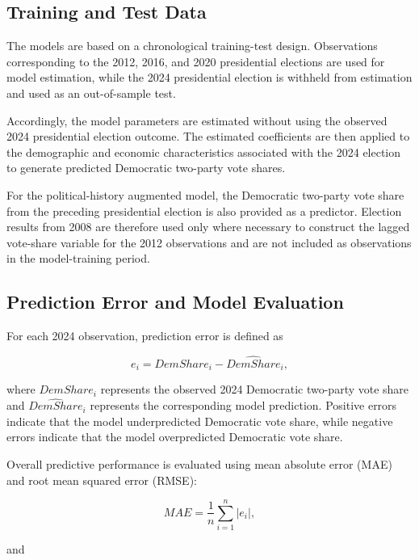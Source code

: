 \documentclass[12pt]{article}
\begin{document}
	
	\subsection{Training and Test Data}
	
	The models are based on a chronological training-test design.
	Observations corresponding to the 2012, 2016, and 2020 presidential
	elections are used for model estimation, while the 2024 presidential
	election is withheld from estimation and used as an out-of-sample test.
	
	Accordingly, the model parameters are estimated without using the
	observed 2024 presidential election outcome. The estimated coefficients
	are then applied to the demographic and economic characteristics
	associated with the 2024 election to generate predicted Democratic
	two-party vote shares.
	
	For the political-history augmented model, the Democratic
	two-party vote share from the preceding presidential election is also
	provided as a predictor. Election results from 2008 are therefore used
	only where necessary to construct the lagged vote-share variable for
	the 2012 observations and are not included as observations
	in the model-training period.
	
	
	\subsection{Prediction Error and Model Evaluation}
	
	For each 2024 observation, prediction error is defined as
	
	\begin{equation}
		e_i
		=
		DemShare_i - \widehat{DemShare}_i,
	\end{equation}
	
	where $DemShare_i$ represents the observed 2024 Democratic two-party
	vote share and $\widehat{DemShare}_i$ represents the corresponding
	model prediction. Positive errors indicate that the model
	underpredicted Democratic vote share, while negative errors indicate
	that the model overpredicted Democratic vote share.
	
	Overall predictive performance is evaluated using mean absolute error
	(MAE) and root mean squared error (RMSE):
	
	\begin{equation}
		MAE
		=
		\frac{1}{n}
		\sum_{i=1}^{n}
		|e_i|,
	\end{equation}
	
	and
	
\end{document}
